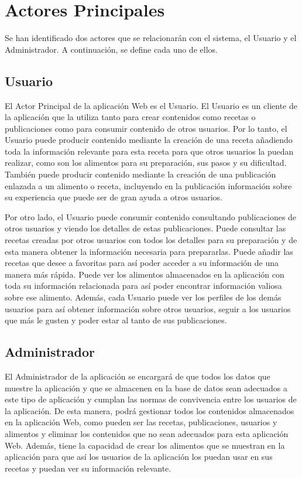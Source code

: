 \section{Actores Principales}
Se han identificado dos actores que se relacionarán con el sistema, el Usuario y el Administrador. A continuación, se define cada uno de ellos.

\subsection{Usuario}

El Actor Principal de la aplicación Web es el Usuario. El Usuario es un cliente de la aplicación que la utiliza tanto para crear contenidos como recetas o publicaciones como para consumir contenido de otros usuarios. Por lo tanto, el Usuario puede producir contenido mediante la creación de una receta añadiendo toda la información relevante para esta receta para que otros usuarios la puedan realizar, como son los alimentos para su preparación, sus pasos y su dificultad. También puede producir contenido mediante la creación de una publicación enlazada a un alimento o receta, incluyendo en la publicación información sobre su experiencia que puede ser de gran ayuda a otros usuarios. 

Por otro lado, el Usuario puede consumir contenido consultando publicaciones de otros usuarios y viendo los detalles de estas publicaciones. Puede consultar las recetas creadas por otros usuarios con todos los detalles para su preparación y de esta manera obtener la información necesaria para prepararlas. Puede añadir las recetas que desee a favoritas para así poder acceder a su información de una manera más rápida. Puede ver los alimentos almacenados en la aplicación con toda su información relacionada para así poder encontrar información valiosa sobre ese alimento. Además, cada Usuario puede ver los perfiles de los demás usuarios para así obtener información sobre otros usuarios, seguir a los usuarios que más le gusten y poder estar al tanto de sus publicaciones.

\subsection{Administrador}

El Administrador de la aplicación se encargará de que todos los datos que muestre la aplicación y que se almacenen en la base de datos sean adecuados a este tipo de aplicación y cumplan las normas de convivencia entre los usuarios de la aplicación. De esta manera, podrá gestionar todos los contenidos almacenados en la aplicación Web, como pueden ser las recetas, publicaciones, usuarios y alimentos y eliminar los contenidos que no sean adecuados para esta aplicación Web. Además, tiene la capacidad de crear los alimentos que se muestran en la aplicación para que así los usuarios de la aplicación los puedan usar en sus recetas y puedan ver su información relevante.


